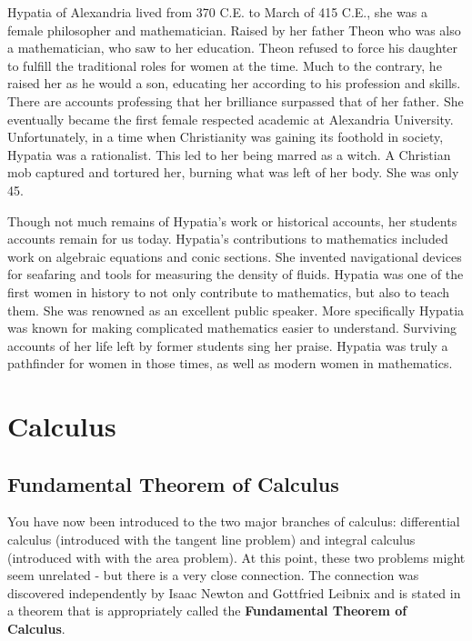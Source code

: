 \documentclass[oneside]{book}
\begin{document}
Hypatia of Alexandria lived from 370 C.E. to March of 415 C.E., she was a female philosopher and mathematician. Raised by her father Theon who was also a mathematician, who saw to her education. Theon refused to force his daughter to fulfill the traditional roles for women at the time. Much to the contrary, he raised her as he would a son, educating her according to his profession and skills. There are accounts professing that her brilliance surpassed that of her father. She eventually became the first female respected academic at Alexandria University. Unfortunately, in a time when Christianity was gaining its foothold in society, Hypatia was a rationalist. This led to her being marred as a witch. A Christian mob captured and tortured her, burning what was left of her body. She was only 45. 

\bigskip

Though not much remains of Hypatia’s work or historical accounts, her students accounts remain for us today. Hypatia’s contributions to mathematics included work on algebraic equations and conic sections. She invented navigational devices for seafaring and tools for measuring the density of fluids. Hypatia was one of the first women in history to not only contribute to mathematics, but also to teach them. She was renowned as an excellent public speaker. More specifically Hypatia was known for making complicated mathematics easier to understand. Surviving accounts of her life left by former students sing her praise. Hypatia was truly a pathfinder for women in those times, as well as modern women in mathematics.\\

\cite{Hypatia}

\chapter{Calculus}

\section{\color{mypink}Fundamental Theorem of Calculus}
\color{black}
You have now been introduced to the two major branches of calculus: differential calculus (introduced with the tangent line problem) and integral calculus (introduced with with the area problem). At this point, these two problems might seem unrelated - but there is a very close connection. The connection was discovered independently by Isaac Newton and Gottfried Leibnix and is stated in a theorem that is appropriately called the \textbf{Fundamental Theorem of Calculus}.
\end{document}
